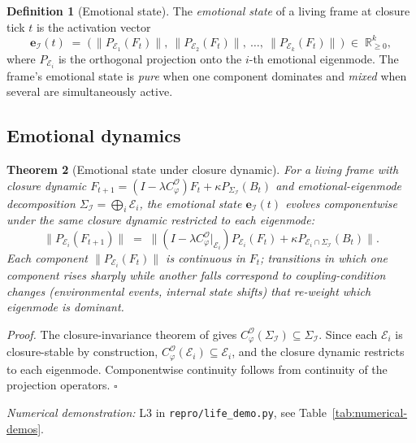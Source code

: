 \documentclass[11pt]{article}
\theoremstyle{plain}
\newtheorem{theorem}{Theorem}[section]
\theoremstyle{definition}
\newtheorem{definition}[theorem]{Definition}
\theoremstyle{remark}
\newcommand{\Ical}{\mathcal{I}}
\newcommand{\Ocal}{\mathcal{O}}
\newcommand{\Cph}{C_\varphi}
\begin{document}
\begin{definition}[Emotional state]\label{def:emotional-state}
The \emph{emotional state} of a living frame at closure tick $t$ is the activation vector
\[
  \mathbf{e}_\Ical(t) \;=\; \big(\, \|P_{\mathcal{E}_1}(F_t)\|,\ \|P_{\mathcal{E}_2}(F_t)\|,\ \ldots,\ \|P_{\mathcal{E}_k}(F_t)\| \,\big) \;\in\; \mathbb{R}_{\geq 0}^k,
\]
where $P_{\mathcal{E}_i}$ is the orthogonal projection onto the $i$-th emotional eigenmode. The frame's emotional state is \emph{pure} when one component dominates and \emph{mixed} when several are simultaneously active.
\end{definition}

\subsection{Emotional dynamics}

\begin{theorem}[Emotional state under closure dynamic]\label{thm:emotion-dynamics}
For a living frame with closure dynamic $F_{t+1} = (I - \lambda \Cph^\Ocal) F_t + \kappa P_{\Sigma_\Ical}(B_t)$ and emotional-eigenmode decomposition $\Sigma_\Ical = \bigoplus_i \mathcal{E}_i$, the emotional state $\mathbf{e}_\Ical(t)$ evolves componentwise under the same closure dynamic restricted to each eigenmode:
\[
  \|P_{\mathcal{E}_i}(F_{t+1})\| \;=\; \|(I - \lambda \Cph^\Ocal|_{\mathcal{E}_i}) P_{\mathcal{E}_i}(F_t) + \kappa P_{\mathcal{E}_i \cap \Sigma_\Ical}(B_t)\|.
\]
Each component $\|P_{\mathcal{E}_i}(F_t)\|$ is continuous in $F_t$; transitions in which one component rises sharply while another falls correspond to coupling-condition changes (environmental events, internal state shifts) that re-weight which eigenmode is dominant.
\end{theorem}

\noindent\emph{Proof.} The closure-invariance theorem of \citet{SmartExistenceClosure} gives $\Cph^\Ocal(\Sigma_\Ical) \subseteq \Sigma_\Ical$. Since each $\mathcal{E}_i$ is closure-stable by construction, $\Cph^\Ocal(\mathcal{E}_i) \subseteq \mathcal{E}_i$, and the closure dynamic restricts to each eigenmode. Componentwise continuity follows from continuity of the projection operators. \hfill$\square$

\noindent\emph{Numerical demonstration:} L3 in \texttt{repro/life\_demo.py}, see Table~\ref{tab:numerical-demos}.
\end{document}

